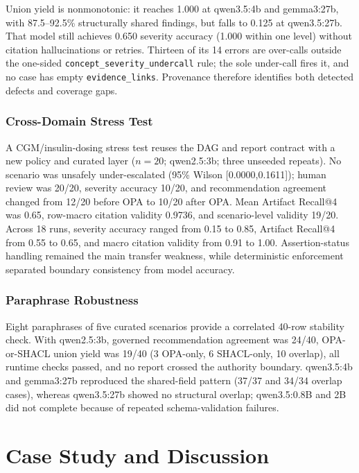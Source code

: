 \documentclass[journal,twoside,web]{ieeecolor}
\begin{document}
Union yield is nonmonotonic: it reaches 1.000 at qwen3.5:4b and gemma3:27b, with 87.5--92.5\% structurally shared findings, but falls to 0.125 at qwen3.5:27b. That model still achieves 0.650 severity accuracy (1.000 within one level) without citation hallucinations or retries. Thirteen of its 14 errors are over-calls outside the one-sided \texttt{concept\_severity\_undercall} rule; the sole under-call fires it, and no case has empty \texttt{evidence\_links}. Provenance therefore identifies both detected defects and coverage gaps.

\subsubsection{Cross-Domain Stress Test}
\label{sec:cgm-generalization}

A CGM/insulin-dosing stress test reuses the DAG and report contract with a new policy and curated layer ($n=20$; qwen2.5:3b; three unseeded repeats). No scenario was unsafely under-escalated (95\% Wilson [0.0000,0.1611]); human review was 20/20, severity accuracy 10/20, and recommendation agreement changed from 12/20 before OPA to 10/20 after OPA. Mean Artifact Recall@4 was 0.65, row-macro citation validity 0.9736, and scenario-level validity 19/20. Across 18 runs, severity accuracy ranged from 0.15 to 0.85, Artifact Recall@4 from 0.55 to 0.65, and macro citation validity from 0.91 to 1.00. Assertion-status handling remained the main transfer weakness, while deterministic enforcement separated boundary consistency from model accuracy.

\subsubsection{Paraphrase Robustness}
\label{sec:paraphrase-robustness}

Eight paraphrases of five curated scenarios provide a correlated 40-row stability check. With qwen2.5:3b, governed recommendation agreement was 24/40, OPA-or-SHACL union yield was 19/40 (3 OPA-only, 6 SHACL-only, 10 overlap), all runtime checks passed, and no report crossed the authority boundary. qwen3.5:4b and gemma3:27b reproduced the shared-field pattern (37/37 and 34/34 overlap cases), whereas qwen3.5:27b showed no structural overlap; qwen3.5:0.8B and 2B did not complete because of repeated schema-validation failures.

\section{Case Study and Discussion}
\label{sec:case-study}
\end{document}
